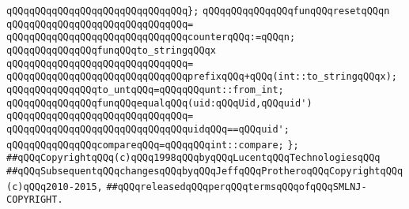 \verb|qQQqqQQqqQQqqQQqqQQqqQQqqQQqqQQq};|\newline
\newline
\verb|qQQqqQQqqQQqqQQqfunqQQqresetqQQqn|\newline
\verb|qQQqqQQqqQQqqQQqqQQqqQQqqQQqqQQq=|\newline
\verb|qQQqqQQqqQQqqQQqqQQqqQQqqQQqqQQqcounterqQQq:=qQQqn;|\newline
\newline
\verb|qQQqqQQqqQQqqQQqfunqQQqto_stringqQQqx|\newline
\verb|qQQqqQQqqQQqqQQqqQQqqQQqqQQqqQQq=|\newline
\verb|qQQqqQQqqQQqqQQqqQQqqQQqqQQqqQQqprefixqQQq+qQQq(int::to_stringqQQqx);|\newline
\newline
\verb|qQQqqQQqqQQqqQQqto_untqQQq=qQQqqQQqunt::from_int;|\newline
\newline
\verb|qQQqqQQqqQQqqQQqfunqQQqequalqQQq(uid:qQQqUid,qQQquid')|\newline
\verb|qQQqqQQqqQQqqQQqqQQqqQQqqQQqqQQq=|\newline
\verb|qQQqqQQqqQQqqQQqqQQqqQQqqQQqqQQquidqQQq==qQQquid';|\newline
\newline
\verb|qQQqqQQqqQQqqQQqcompareqQQq=qQQqqQQqint::compare;|\newline
\newline
\verb|};|\newline
\newline
\newline
\newline
\verb|##qQQqCopyrightqQQq(c)qQQq1998qQQqbyqQQqLucentqQQqTechnologiesqQQq|\newline
\verb|##qQQqSubsequentqQQqchangesqQQqbyqQQqJeffqQQqProtheroqQQqCopyrightqQQq(c)qQQq2010-2015,|\newline
\verb|##qQQqreleasedqQQqperqQQqtermsqQQqofqQQqSMLNJ-COPYRIGHT.|\newline

